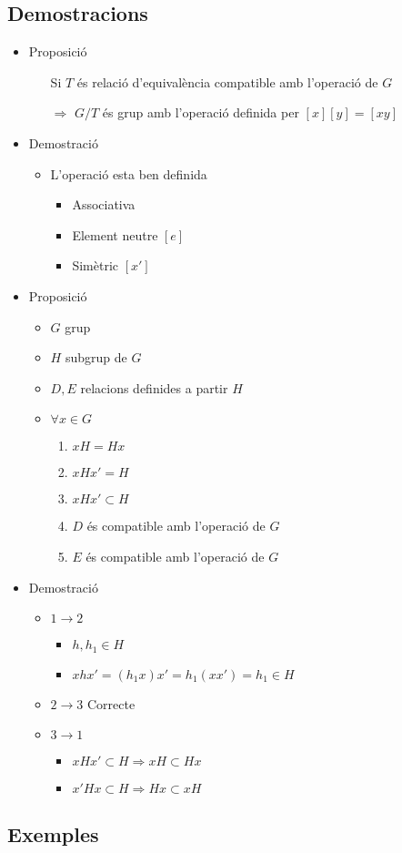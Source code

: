 \documentclass{article}
\begin{document}
\subsection*{Demostracions}
\begin{itemize}
\item Proposició
	\begin{itemize}
	\item[Si] $T$ és relació d'equivalència compatible amb l'operació de $G$
	\item[$\Rightarrow$] $G/T$ és grup amb l'operació definida per
		\subitem $[x][y] = [xy]$
	\end{itemize}
\item Demostració
	\begin{itemize}
	\item L'operació esta ben definida
		\begin{itemize}
		\item Associativa
		\item Element neutre $[e]$
		\item Simètric $[x']$
		\end{itemize}
	\end{itemize}
\item Proposició
	\begin{itemize}
	\item $G$ grup
	\item $H$ subgrup de $G$
	\item $D, E$ relacions definides a partir $H$
	\item $\forall x \in G$
		\begin{enumerate}
		\item $xH = Hx$
		\item $xHx' = H$
		\item $xHx' \subset H$
		\item $D$ és compatible amb l'operació de $G$
		\item $E$ és compatible amb l'operació de $G$
		\end{enumerate}
	\end{itemize}
\item Demostració
	\begin{itemize}
	\item $1 \to 2$
		\begin{itemize}
		\item $h, h_1 \in H$
		\item $xhx' = (h_1x)x' = h_1 (xx') = h_1 \in H$
		\end{itemize}
	\item $2 \to 3$ Correcte
	\item $3 \to 1$
		\begin{itemize}
		\item $xHx' \subset H \Rightarrow xH \subset Hx$
		\item $x'Hx \subset H \Rightarrow Hx \subset xH$
		\end{itemize}
	\end{itemize}
\end{itemize}

\subsection*{Exemples}
\end{document}
